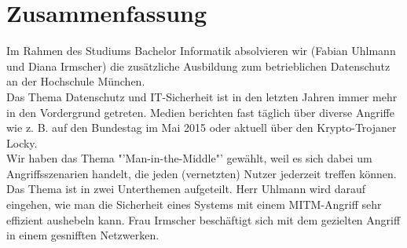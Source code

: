 \section*{Zusammenfassung}
Im Rahmen des Studiums Bachelor Informatik absolvieren wir (Fabian Uhlmann und Diana Irmscher) die zusätzliche Ausbildung zum betrieblichen Datenschutz an der Hochschule München.
\\
Das Thema Datenschutz und IT-Sicherheit ist in den letzten Jahren immer mehr in den Vordergrund getreten. Medien berichten fast täglich über diverse Angriffe wie z. B. auf den Bundestag im Mai 2015 oder aktuell über den Krypto-Trojaner Locky.
\\	
Wir haben das Thema "'Man-in-the-Middle"' gewählt, weil es sich dabei um Angriffsszenarien handelt, die jeden (vernetzten) Nutzer jederzeit treffen können.
\\	
Das Thema ist in zwei Unterthemen aufgeteilt.
Herr Uhlmann wird darauf eingehen, wie man die Sicherheit eines Systems mit einem MITM-Angriff sehr effizient aushebeln kann.
Frau Irmscher beschäftigt sich mit dem gezielten Angriff in einem gesnifften Netzwerken.
{}
		 
